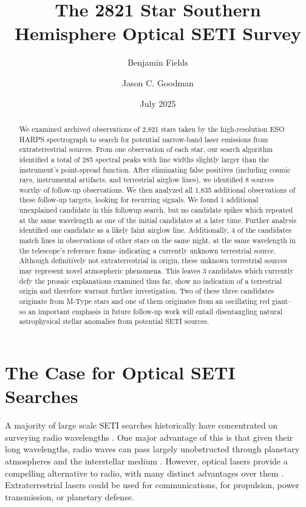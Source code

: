 \documentclass[twocolumn]{aastex701}
\begin{document}
\title{The 2821 Star Southern Hemisphere Optical SETI Survey}
\author[0009-0008-7048-916X]{Benjamin Fields} %

\author[0000-0002-6755-2710]{Jason C. Goodman}

\date{July 2025}

\begin{abstract}
We examined archived observations of 2,821 stars taken by the high-resolution ESO HARPS spectrograph to search for potential narrow-band laser emissions from extraterrestrial sources. From one observation of each star, our search algorithm identified a total of 285 spectral peaks with line widths slightly larger than the instrument's point-spread function.  After eliminating  false positives (including cosmic rays, instrumental artifacts, and terrestrial airglow lines), we identified 8 sources worthy of follow-up observations. We then analyzed all 1,835 additional observations of these follow-up targets, looking for recurring signals. We found 1 additional unexplained candidate in this followup search, but no candidate spikes which repeated at the same wavelength as one of the initial candidates at a later time.  Further analysis identified one candidate as a likely faint airglow line. Additionally, 4 of the candidates match lines in observations of other stars on the same night, at the same wavelength in the telescope's reference frame--indicating a currently unknown terrestrial source. Although definitively not extraterrestrial in origin, these unknown terrestrial sources may represent novel atmospheric phenomena. This leaves 3 candidates which currently defy the prosaic explanations examined thus far, show no indication of a terrestrial origin and therefore warrant further investigation. Two of these three candidates originate from M-Type stars and one of them originates from an oscillating red giant--so an important emphasis in future follow-up work will entail disentangling natural astrophysical stellar anomalies from potential SETI sources.
\end{abstract}

\section{The Case for Optical SETI Searches}
A majority of large scale SETI searches historically have concentrated on surveying radio wavelengths \citep{Gray_2017,OZMAII,LAMPTON1992189,Price_2020,PeterMa,Wright_2018}. One major advantage of this is that given their long wavelengths, radio waves can pass largely unobstructed through planetary atmospheres and the interstellar medium \citep{COCCONI_MORRISON_1959}. However, optical lasers provide a compelling alternative to radio, with many distinct advantages over them \citep{caseforopticalseti}. Extraterrestrial lasers could be used for communications, for propulsion, power transmission, or planetary defense.  
\end{document}

